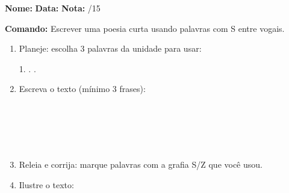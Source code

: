 

\begin{exercicio}

\noindent\textbf{Nome:} \underline{\hspace{3.2cm}} \quad \textbf{Data:} \underline{\hspace{1.6cm}} \quad \textbf{Nota:} \underline{\hspace{0.9cm}}/15


\noindent\textbf{Comando:} Escrever uma poesia curta usando palavras com S entre vogais.


\begin{enumerate}

  \item Planeje: escolha 3 palavras da unidade para usar:
  \begin{center}
  1. \underline{\hspace{3cm}} . \underline{\hspace{3cm}} . \underline{\hspace{3cm}}
  \end{center}

  \item Escreva o texto (mínimo 3 frases):
  \begin{center}
  \underline{\hspace{12cm}}\\\underline{\hspace{12cm}}\\\underline{\hspace{12cm}}\\\underline{\hspace{12cm}}\\\underline{\hspace{12cm}}
  \end{center}

  \item Releia e corrija: marque palavras com a grafia S/Z que você usou.

  \item Ilustre o texto:
  \begin{center}
  \end{center}

\end{enumerate}

\end{exercicio}

